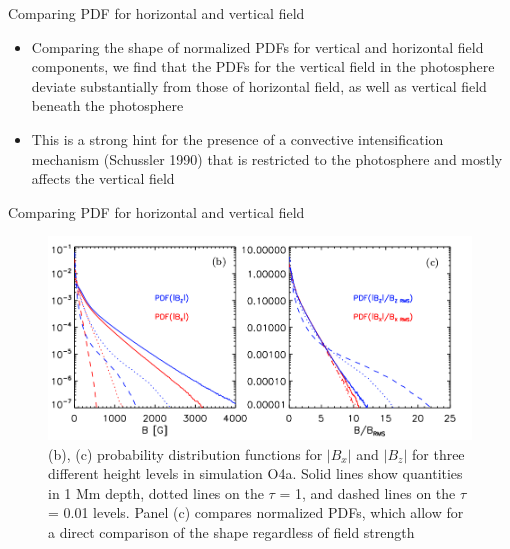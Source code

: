 \documentclass{beamer}
\begin{document}
\begin{frame}{Comparing PDF for horizontal and vertical field}

\begin{itemize}
\item Comparing the shape of normalized
PDFs for vertical and horizontal field components, we find
that the PDFs for the vertical field in the photosphere deviate
substantially from those of horizontal field, as well as vertical
field beneath the photosphere

\item This is a strong
hint for the presence of a convective intensification mechanism
(Schussler 1990) that is restricted to the photosphere and mostly
affects the vertical field
\end{itemize}
\end{frame}


\begin{frame}{Comparing PDF for horizontal and vertical field}
\begin{figure}[H]
 \centering
 \includegraphics[scale=0.3]{img44-2.png}
	\caption{
(b), (c) probability distribution functions for $\lvert B_x \rvert$ and $\lvert B_z \rvert$ for three different height levels in simulation O4a. Solid
lines show quantities in 1 Mm depth, dotted lines on the $\tau$ = 1, and dashed lines on the $\tau$ = 0.01 levels. Panel (c) compares normalized PDFs, which allow for a direct
comparison of the shape regardless of field strength}
\end{figure}

\end{frame}
\end{document}
